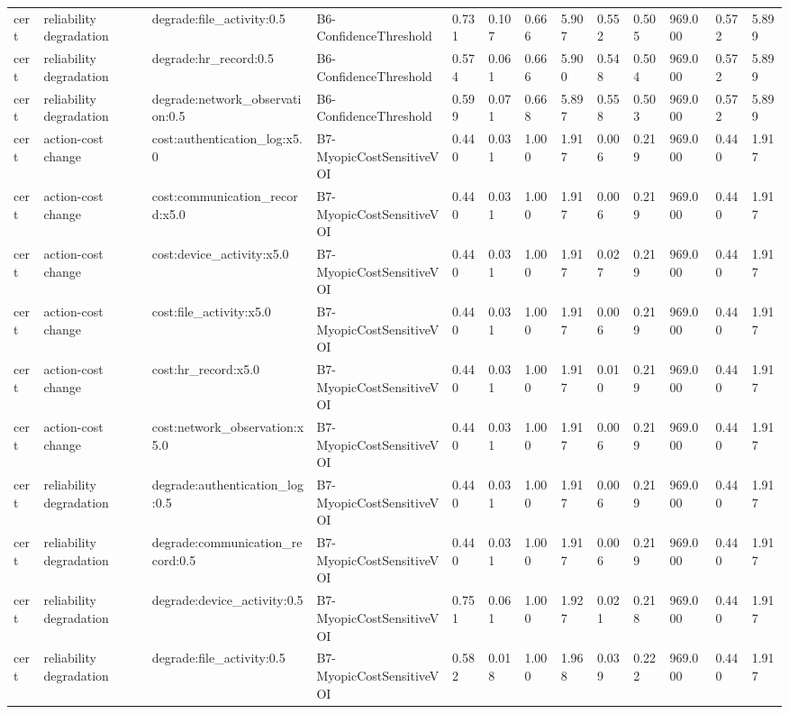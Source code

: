 \begin{table}[!ht]
{\begin{tabular}{lllllllllllll}
cert & reliability degradation & degrade:file\_activity:0.5 & B6-ConfidenceThreshold & 0.731 & 0.107 & 0.666 & 5.907 & 0.552 & 0.505 & 969.000 & 0.572 & 5.899 \\
cert & reliability degradation & degrade:hr\_record:0.5 & B6-ConfidenceThreshold & 0.574 & 0.061 & 0.666 & 5.900 & 0.548 & 0.504 & 969.000 & 0.572 & 5.899 \\
cert & reliability degradation & degrade:network\_observation:0.5 & B6-ConfidenceThreshold & 0.599 & 0.071 & 0.668 & 5.897 & 0.558 & 0.503 & 969.000 & 0.572 & 5.899 \\
cert & action-cost change & cost:authentication\_log:x5.0 & B7-MyopicCostSensitiveVOI & 0.440 & 0.031 & 1.000 & 1.917 & 0.006 & 0.219 & 969.000 & 0.440 & 1.917 \\
cert & action-cost change & cost:communication\_record:x5.0 & B7-MyopicCostSensitiveVOI & 0.440 & 0.031 & 1.000 & 1.917 & 0.006 & 0.219 & 969.000 & 0.440 & 1.917 \\
cert & action-cost change & cost:device\_activity:x5.0 & B7-MyopicCostSensitiveVOI & 0.440 & 0.031 & 1.000 & 1.917 & 0.027 & 0.219 & 969.000 & 0.440 & 1.917 \\
cert & action-cost change & cost:file\_activity:x5.0 & B7-MyopicCostSensitiveVOI & 0.440 & 0.031 & 1.000 & 1.917 & 0.006 & 0.219 & 969.000 & 0.440 & 1.917 \\
cert & action-cost change & cost:hr\_record:x5.0 & B7-MyopicCostSensitiveVOI & 0.440 & 0.031 & 1.000 & 1.917 & 0.010 & 0.219 & 969.000 & 0.440 & 1.917 \\
cert & action-cost change & cost:network\_observation:x5.0 & B7-MyopicCostSensitiveVOI & 0.440 & 0.031 & 1.000 & 1.917 & 0.006 & 0.219 & 969.000 & 0.440 & 1.917 \\
cert & reliability degradation & degrade:authentication\_log:0.5 & B7-MyopicCostSensitiveVOI & 0.440 & 0.031 & 1.000 & 1.917 & 0.006 & 0.219 & 969.000 & 0.440 & 1.917 \\
cert & reliability degradation & degrade:communication\_record:0.5 & B7-MyopicCostSensitiveVOI & 0.440 & 0.031 & 1.000 & 1.917 & 0.006 & 0.219 & 969.000 & 0.440 & 1.917 \\
cert & reliability degradation & degrade:device\_activity:0.5 & B7-MyopicCostSensitiveVOI & 0.751 & 0.061 & 1.000 & 1.927 & 0.021 & 0.218 & 969.000 & 0.440 & 1.917 \\
cert & reliability degradation & degrade:file\_activity:0.5 & B7-MyopicCostSensitiveVOI & 0.582 & 0.018 & 1.000 & 1.968 & 0.039 & 0.222 & 969.000 & 0.440 & 1.917 \\

\end{tabular}}
\end{table}
